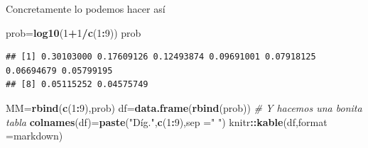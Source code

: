 \documentclass[
]{article}
\newenvironment{Shaded}{\begin{snugshade}}{\end{snugshade}}
\newcommand{\CommentTok}[1]{\textcolor[rgb]{0.56,0.35,0.01}{\textit{#1}}}
\newcommand{\DataTypeTok}[1]{\textcolor[rgb]{0.13,0.29,0.53}{#1}}
\newcommand{\DecValTok}[1]{\textcolor[rgb]{0.00,0.00,0.81}{#1}}
\newcommand{\KeywordTok}[1]{\textcolor[rgb]{0.13,0.29,0.53}{\textbf{#1}}}
\newcommand{\NormalTok}[1]{#1}
\newcommand{\OperatorTok}[1]{\textcolor[rgb]{0.81,0.36,0.00}{\textbf{#1}}}
\newcommand{\StringTok}[1]{\textcolor[rgb]{0.31,0.60,0.02}{#1}}
\begin{document}
Concretamente lo podemos hacer así

\begin{Shaded}
\begin{Highlighting}[]
\NormalTok{prob=}\KeywordTok{log10}\NormalTok{(}\DecValTok{1}\OperatorTok{+}\DecValTok{1}\OperatorTok{/}\KeywordTok{c}\NormalTok{(}\DecValTok{1}\OperatorTok{:}\DecValTok{9}\NormalTok{))}
\NormalTok{prob}
\end{Highlighting}
\end{Shaded}

\begin{verbatim}
## [1] 0.30103000 0.17609126 0.12493874 0.09691001 0.07918125 0.06694679 0.05799195
## [8] 0.05115252 0.04575749
\end{verbatim}

\begin{Shaded}
\begin{Highlighting}[]
\NormalTok{MM=}\KeywordTok{rbind}\NormalTok{(}\KeywordTok{c}\NormalTok{(}\DecValTok{1}\OperatorTok{:}\DecValTok{9}\NormalTok{),prob)}
\NormalTok{df=}\KeywordTok{data.frame}\NormalTok{(}\KeywordTok{rbind}\NormalTok{(prob))}
\CommentTok{\# Y hacemos una bonita tabla}
\KeywordTok{colnames}\NormalTok{(df)=}\KeywordTok{paste}\NormalTok{(}\StringTok{"Díg."}\NormalTok{,}\KeywordTok{c}\NormalTok{(}\DecValTok{1}\OperatorTok{:}\DecValTok{9}\NormalTok{),}\DataTypeTok{sep =}\StringTok{" "}\NormalTok{)}
\NormalTok{knitr}\OperatorTok{::}\KeywordTok{kable}\NormalTok{(df,}\DataTypeTok{format =}\StringTok{\textquotesingle{}markdown\textquotesingle{}}\NormalTok{)}
\end{Highlighting}
\end{Shaded}
\end{document}

